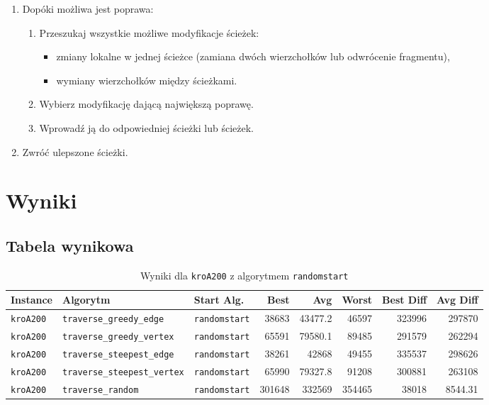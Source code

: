 \documentclass[11pt]{article}
\begin{document}
\begin{enumerate}
  \item Dopóki możliwa jest poprawa:
  \begin{enumerate}
    \item Przeszukaj wszystkie możliwe modyfikacje ścieżek:
    \begin{itemize}
      \item zmiany lokalne w jednej ścieżce (zamiana dwóch wierzchołków lub odwrócenie fragmentu),
      \item wymiany wierzchołków między ścieżkami.
    \end{itemize}
    \item Wybierz modyfikację dającą największą poprawę.
    \item Wprowadź ją do odpowiedniej ścieżki lub ścieżek.
  \end{enumerate}
  \item Zwróć ulepszone ścieżki.
\end{enumerate}


\section{Wyniki}\label{sec:wyniki}

\subsection{Tabela wynikowa}\label{subsec:tabela-wynikowa}

\begin{table}[ht]
\centering
\begin{tabular}{|l|l|l|r|r|r|r|r|}
\hline
\textbf{Instance} & \textbf{Algorytm} & \textbf{Start Alg.} & \textbf{Best} & \textbf{Avg} & \textbf{Worst} & \textbf{Best Diff} & \textbf{Avg Diff} \\
\hline
\texttt{kroA200} & \texttt{traverse\_greedy\_edge} & \texttt{randomstart} & 38683 & 43477.2 & 46597 & 323996 & 297870 \\
\texttt{kroA200} & \texttt{traverse\_greedy\_vertex} & \texttt{randomstart} & 65591 & 79580.1 & 89485 & 291579 & 262294 \\
\texttt{kroA200} & \texttt{traverse\_steepest\_edge} & \texttt{randomstart} & 38261 & 42868 & 49455 & 335537 & 298626 \\
\texttt{kroA200} & \texttt{traverse\_steepest\_vertex} & \texttt{randomstart} & 65990 & 79327.8 & 91208 & 300881 & 263108 \\
\texttt{kroA200} & \texttt{traverse\_random} & \texttt{randomstart} & 301648 & 332569 & 354465 & 38018 & 8544.31 \\
\hline
\end{tabular}
\caption{Wyniki dla \texttt{kroA200} z algorytmem \texttt{randomstart}}\label{tab:table}
\end{table}
\end{document}

